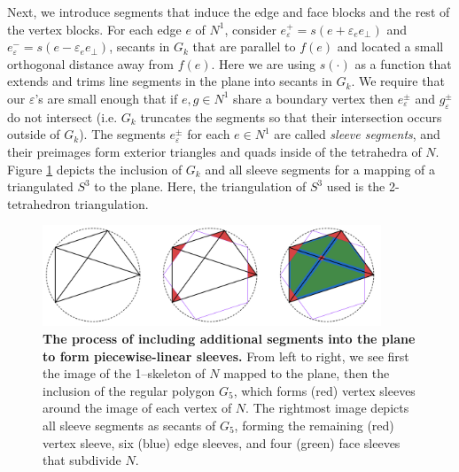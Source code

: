 Next, we introduce segments that induce the edge and face blocks and the rest of the vertex blocks.
For each edge $e$ of $N^1$, consider $e_\varepsilon^+ = s(e+\varepsilon_e e_\perp)$ and $e_\varepsilon^- =s(e-\varepsilon_e e_\perp)$, secants in $G_k$ that are parallel to $f(e)$ and located a small orthogonal distance away from $f(e)$.
Here we are using $s(\cdot)$ as a function that extends and trims line segments in the plane into secants in $G_k$.
We require that our $\varepsilon$'s are small enough that if $e,g\in N^1$ share a boundary vertex then $e_\varepsilon^\pm$ and $g_\varepsilon^\pm$ do not intersect (i.e. $G_k$ truncates the segments so that their intersection occurs outside of $G_k$).
The segments $e_\varepsilon^\pm$ for each $e\in N^1$ are called \emph{sleeve segments}, and their preimages form exterior triangles and quads inside of the tetrahedra of $N$.
Figure \ref{fig:pl-segments} depicts the inclusion of $G_k$ and all sleeve segments for a mapping of a triangulated $S^3$ to the plane.
Here, the triangulation of $S^3$ used is the 2-tetrahedron triangulation.

\begin{figure}[h!]
	\centering
	\includegraphics[width=0.9\textwidth]{figures/pl-segments.png}
	\caption{
		\textbf{The process of including additional segments into the plane to form piecewise-linear sleeves.}
		From left to right, we see first the image of the 1--skeleton of $N$ mapped to the plane, then the inclusion of the regular polygon $G_5$, which forms (red) vertex sleeves around the image of each vertex of $N$.
		The rightmost image depicts all sleeve segments as secants of $G_5$, forming the remaining (red) vertex sleeve, six (blue) edge sleeves, and four (green) face sleeves that subdivide $N$.
	}
	\label{fig:pl-segments}
\end{figure}


